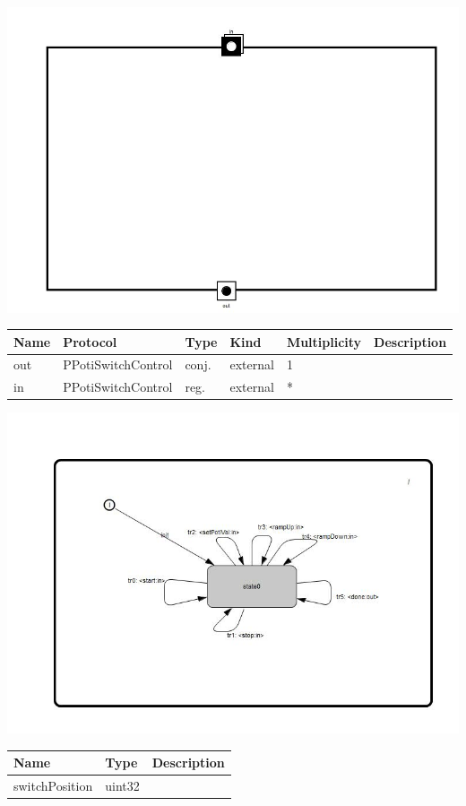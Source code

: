 
{
\centering{}
\includegraphics[width=1.0\textwidth]{./images/APotiSwitchCtrlMux_structure.jpg}
}

\begin{tabular}[ht]{|l|l|l|l|l|p{5cm}|}
\hline
\textbf{Name} & \textbf{Protocol} & \textbf{Type} & \textbf{Kind} & \textbf{Multiplicity} & \textbf{Description}\\
\hline
out & PPotiSwitchControl & conj. & external & 1 & \\
\hline
in & PPotiSwitchControl & reg. & external & * & \\
\hline
\end{tabular}

{
\centering{}
\includegraphics[width=1.0\textwidth]{./images/APotiSwitchCtrlMux_behavior.jpg}
}

\begin{par}

\end{par}


\begin{tabular}[ht]{|l|l|p{8cm}|}
\hline
\textbf{Name} & \textbf{Type} & \textbf{Description}\\
\hline
switchPosition & uint32 & \\
\hline
\end{tabular}

